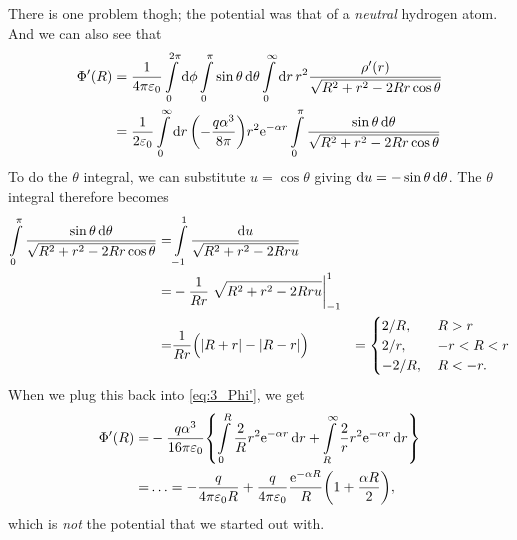 \documentclass[11pt,letter, swedish, english
]{article}
\let\oldint\int
\renewcommand{\int}{\oldint\limits}
\newcommand{\enaught}{\ensuremath\varepsilon_0}
\begin{document}
There is one problem thogh; the potential was that of a \emph{neutral}
hydrogen atom. And we can also see that\footnotemark{}
\begin{equation}\label{eq:3_Phi'}
\begin{aligned}
\Phi'(R)&=\frac{1}{4\pi\enaught}\int_0^{2\pi}\rd\phi\int_0^\pi\sin\theta\id\theta
\int_0^\infty\rd{r}\, 
r^2\frac{\rho'(r)}{\sqrt{R^2+r^2-2Rr\cos\theta}}\\
&=\frac{1}{2\enaught}\int_0^\infty\rd{r}\,
\qty(-\frac{q\alpha^3}{8\pi})r^2\ee^{-\alpha r}
\int_0^\pi\frac{\sin\theta\,\rd\theta}{\sqrt{R^2+r^2-2Rr\cos\theta}}\\
\end{aligned}
\end{equation}
To do the $\theta$ integral, we can substitute $u=\cos\theta$ giving
$\mathrm{d}{u}=-\sin\theta\,\mathrm{d}\theta$. The $\theta$ integral therefore becomes
\begin{equation}
\begin{aligned}
\int_0^\pi\frac{\sin\theta\,\rd\theta}{\sqrt{R^2+r^2-2Rr\cos\theta}}
=&\int_{-1}^1\frac{\rd{u}}{\sqrt{R^2+r^2-2Rru}}\\
=&-\frac{1}{Rr}\eval{\sqrt{R^2+r^2-2Rru}}_{-1}^1\\
=&\frac{1}{Rr}\Big(|R+r|-|R-r|\Big)
&=\begin{cases}
2/R\qcomma&R>r\\
2/r,&-r<R<r\\
-2/R,&R<-r.
\end{cases}
\end{aligned}
\end{equation}
When we plug this back into \eqref{eq:3_Phi'}, we get
\begin{equation}\label{eq:3_Phi'_final}
\begin{aligned}
\Phi'(R)=&-\frac{q\alpha^3}{16\pi\enaught}\qty{
\int_0^R\frac{2}{R}r^2\ee^{-\alpha r}\id{r}
+\int_R^\infty\frac{2}{r}r^2\ee^{-\alpha r}\id{r} }\\
=&\ldots=-\frac{q}{4\pi\enaught R}
+\frac{q}{4\pi\enaught}\frac{\ee^{-\alpha R}}{R}
\qty(1+\frac{\alpha R}{2}),
\end{aligned}
\end{equation}
which is \emph{not} the potential that we started out with.

\end{document}
